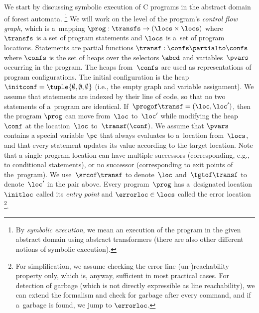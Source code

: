 We start by discussing symbolic execution of C programs in the abstract domain of forest automata.%
\footnote{By \emph{symbolic execution}, we mean an execution of the program
in the given abstract domain using abstract transformers (there are also other
different notions of symbolic execution).}
%
We will work on the level of the program's \emph{control flow graph},
which is a~mapping $\prog: \transfs \to (\locs \times \locs)$ where $\transfs$ is a set of
program statements and $\locs$ is a~set of program locations.
Statements are partial functions $\transf:\confs\partialto\confs$ where
$\confs$ is the set of heaps over the selectors $\abcd$ and variables~$\pvars$
occurring in the program.
The heaps from~$\confs$ are used as representations of program configurations.
The initial configuration is the heap~$\initconf =
\tuple{\emptyset,\emptyset,\emptyset}$ (i.e., the empty graph and variable assignment).
%
%
%
We assume that statements are indexed by their line of code, so that no two
statements of a~program are identical.
%
If~$\progof \transf = (\loc, \loc')$,
then the program $\prog$ can move from~$\loc$ to~$\loc'$ while modifying 
the heap~$\conf$ at the location~$\loc$ to~$\transf(\conf)$. 
%
We assume that $\pvars$ contains a special variable $\pc$ that always evaluates
to a~location from~$\locs$, and that every statement updates its value
according to the target location.
%
%
%
Note that a single program location can have multiple successors
(corresponding, e.g., to conditional statements), or no successor
(corresponding to exit points of the~program).
%
We use~$\srcof \transf$ to denote~$\loc$ and~$\tgtof \transf$ to
denote~$\loc'$ in the pair above.
Every program~$\prog$ has a~designated location $\initloc$ called its
\emph{entry point}
and $\errorloc\in\locs$ called the error location%
\footnote{
For simplification, we assume checking the error line (un-)reachability property
only,
which is, anyway, sufficient in most practical cases.
For detection of garbage (which is not directly expressible as line
reachability), we can extend the formalism and check for garbage after every
command, and if a~garbage is found, we jump to $\errorloc$.
}.


